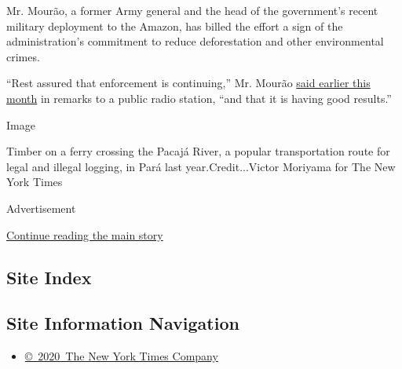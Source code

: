 Mr. Mourão, a former Army general and the head of the government's
recent military deployment to the Amazon, has billed the effort a sign
of the administration's commitment to reduce deforestation and other
environmental crimes.

``Rest assured that enforcement is continuing,'' Mr. Mourão
\href{https://www.gov.br/pt-br/noticias/meio-ambiente-e-clima/2020/07/em-programa-de-radio-mourao-fala-sobre-fiscalizacao-na-amazonia}{said
earlier this month} in remarks to a public radio station, ``and that it
is having good results.''

Image

Timber on a ferry crossing the Pacajá River, a popular transportation
route for legal and illegal logging, in Pará last year.Credit...Victor
Moriyama for The New York Times

Advertisement

\protect\hyperlink{after-bottom}{Continue reading the main story}

\hypertarget{site-index}{%
\subsection{Site Index}\label{site-index}}

\hypertarget{site-information-navigation}{%
\subsection{Site Information
Navigation}\label{site-information-navigation}}

\begin{itemize}
\tightlist
\item
  \href{https://help.nytimes3xbfgragh.onion/hc/en-us/articles/115014792127-Copyright-notice}{©~2020~The
  New York Times Company}
\end{itemize}

